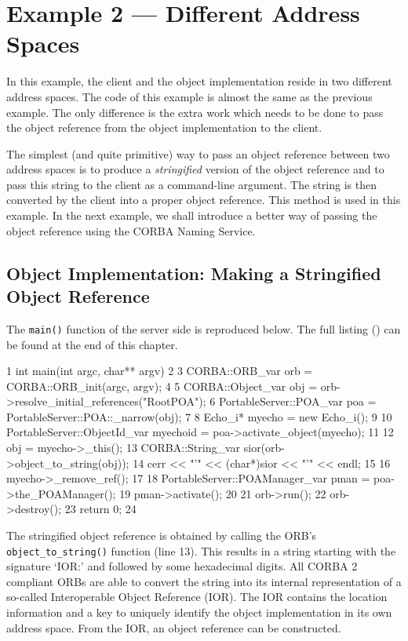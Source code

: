\documentclass[11pt,twoside,a4paper]{book}
\newcommand{\op}[1]{\texttt{#1()}}
\newcommand{\term}[1]{\textit{#1}}
\newcommand{\file}{\begingroup \urlstyle{tt}\Url}
\newcommand{\dsc}{\discretionary{}{}{}}
\begin{document}
\section{Example 2 --- Different Address Spaces}

In this example, the client and the object implementation reside in
two different address spaces. The code of this example is almost the
same as the previous example. The only difference is the extra work
which needs to be done to pass the object reference from the object
implementation to the client.

The simplest (and quite primitive) way to pass an object reference
between two address spaces is to produce a \term{stringified} version
of the object reference and to pass this string to the client as a
command-line argument.  The string is then converted by the client
into a proper object reference.  This method is used in this
example. In the next example, we shall introduce a better way of
passing the object reference using the CORBA Naming Service.

\subsection{Object Implementation: Making a Stringified Object Reference}

The \op{main} function of the server side is reproduced below. The
full listing (\file{eg2_impl.cc}) can be found at the end of this
chapter.

\lstset{stepnumber=1,gobble=4}
\begin{cxxlisting}
 1  int main(int argc, char** argv)
 2  {
 3    CORBA::ORB_var orb = CORBA::ORB_init(argc, argv);
 4
 5    CORBA::Object_var       obj = orb->resolve_initial_references("RootPOA");
 6    PortableServer::POA_var poa = PortableServer::POA::_narrow(obj);
 7
 8    Echo_i* myecho = new Echo_i();
 9
10    PortableServer::ObjectId_var myechoid = poa->activate_object(myecho);
11
12    obj = myecho->_this();
13    CORBA::String_var sior(orb->object_to_string(obj));
14    cerr << "'" << (char*)sior << "'" << endl;
15
16    myecho->_remove_ref();
17
18    PortableServer::POAManager_var pman = poa->the_POAManager();
19    pman->activate();
20
21    orb->run();
22    orb->destroy();
23    return 0;
24  }
\end{cxxlisting}
\lstset{stepnumber=0,gobble=0}

The stringified object reference is obtained by calling the ORB's
\op{object\_to\_\dsc{}string} function (line 13). This results in a
string starting with the signature `IOR:' and followed by some
hexadecimal digits. All CORBA 2 compliant ORBs are able to convert the
string into its internal representation of a so-called Interoperable
Object Reference (IOR). The IOR contains the location information and
a key to uniquely identify the object implementation in its own
address space. From the IOR, an object reference can be constructed.
\end{document}
